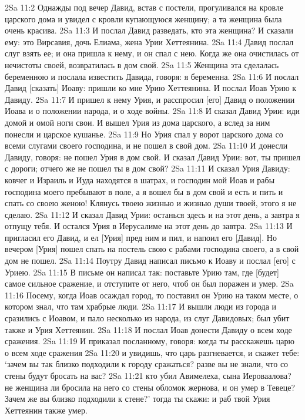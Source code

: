 2Sa 11:2  Однажды под вечер Давид, встав с постели, прогуливался на кровле царского дома и увидел с кровли купающуюся женщину; а та женщина была очень красива.
2Sa 11:3  И послал Давид разведать, кто эта женщина? И сказали ему: это Вирсавия, дочь Елиама, жена Урии Хеттеянина.
2Sa 11:4  Давид послал слуг взять ее; и она пришла к нему, и он спал с нею. Когда же она очистилась от нечистоты своей, возвратилась в дом свой.
2Sa 11:5  Женщина эта сделалась беременною и послала известить Давида, говоря: я беременна.
2Sa 11:6  И послал Давид [сказать] Иоаву: пришли ко мне Урию Хеттеянина. И послал Иоав Урию к Давиду.
2Sa 11:7  И пришел к нему Урия, и расспросил [его] Давид о положении Иоава и о положении народа, и о ходе войны.
2Sa 11:8  И сказал Давид Урии: иди домой и омой ноги свои. И вышел Урия из дома царского, а вслед за ним понесли и царское кушанье.
2Sa 11:9  Но Урия спал у ворот царского дома со всеми слугами своего господина, и не пошел в свой дом.
2Sa 11:10  И донесли Давиду, говоря: не пошел Урия в дом свой. И сказал Давид Урии: вот, ты пришел с дороги; отчего же не пошел ты в дом свой?
2Sa 11:11  И сказал Урия Давиду: ковчег и Израиль и Иуда находятся в шатрах, и господин мой Иоав и рабы господина моего пребывают в поле, а я вошел бы в дом свой и есть и пить и спать со своею женою! Клянусь твоею жизнью и жизнью души твоей, этого я не сделаю.
2Sa 11:12  И сказал Давид Урии: останься здесь и на этот день, а завтра я отпущу тебя. И остался Урия в Иерусалиме на этот день до завтра.
2Sa 11:13  И пригласил его Давид, и ел [Урия] пред ним и пил, и напоил его [Давид]. Но вечером [Урия] пошел спать на постель свою с рабами господина своего, а в свой дом не пошел.
2Sa 11:14  Поутру Давид написал письмо к Иоаву и послал [его] с Уриею.
2Sa 11:15  В письме он написал так: поставьте Урию там, где [будет] самое сильное сражение, и отступите от него, чтоб он был поражен и умер.
2Sa 11:16  Посему, когда Иоав осаждал город, то поставил он Урию на таком месте, о котором знал, что там храбрые люди.
2Sa 11:17  И вышли люди из города и сразились с Иоавом, и пало несколько из народа, из слуг Давидовых; был убит также и Урия Хеттеянин.
2Sa 11:18  И послал Иоав донести Давиду о всем ходе сражения.
2Sa 11:19  И приказал посланному, говоря: когда ты расскажешь царю о всем ходе сражения
2Sa 11:20  и увидишь, что царь разгневается, и скажет тебе: `зачем вы так близко подходили к городу сражаться? разве вы не знали, что со стены будут бросать на вас?
2Sa 11:21  кто убил Авимелеха, сына Иероваалова? не женщина ли бросила на него со стены обломок жернова, и он умер в Тевеце? Зачем же вы близко подходили к стене?' тогда ты скажи: и раб твой Урия Хеттеянин также умер.
